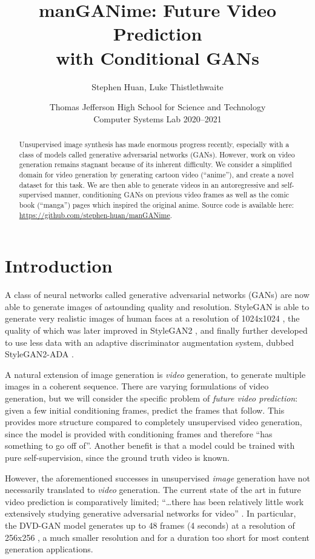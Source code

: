 \documentclass[11pt, oneside]{article}
\title{manGANime: Future Video Prediction \\ with Conditional GANs}
\author{Stephen Huan, Luke Thistlethwaite}
\date{Thomas Jefferson High School for Science and Technology \\
      Computer Systems Lab 2020--2021}
\begin{document}
\maketitle

\begin{abstract}
  Unsupervised image synthesis has made enormous progress recently, especially
  with a class of models called generative adversarial networks (GANs).
  However, work on video generation remains stagnant because of its inherent
  difficulty. We consider a simplified domain for video generation by
  generating cartoon video (\enquote{anime}), and create a novel dataset for
  this task. We are then able to generate videos in an autoregressive and
  self-supervised manner, conditioning GANs on previous video frames as well
  as the comic book (\enquote{manga}) pages which inspired the original anime.
  Source code is available here:
  \href{https://github.com/stephen-huan/manGANime}
       {https://github.com/stephen-huan/manGANime}.
\end{abstract}

\section{Introduction} \label{sec:intro} 
A class of neural networks called generative adversarial networks (GANs)
are now able to generate images of astounding quality and resolution.
StyleGAN is able to generate very realistic images of human faces at a
resolution of 1024x1024 \cite{stylegan}, the quality of which was later
improved in StyleGAN2 \cite{stylegan2}, and finally further developed to
use less data with an adaptive discriminator augmentation system, dubbed
StyleGAN2-ADA \cite{stylegan2ada}.

A natural extension of image generation is \emph{video} generation, to generate
multiple images in a coherent sequence. There are varying formulations of video
generation, but we will consider the specific problem of \emph{future video
prediction}: given a few initial conditioning frames, predict the frames that
follow. This provides more structure compared to completely unsupervised video
generation, since the model is provided with conditioning frames and therefore
\enquote{has something to go off of}. Another benefit is that a model could be
trained with pure self-supervision, since the ground truth video is known.

However, the aforementioned successes in unsupervised \emph{image}
generation have not necessarily translated to \emph{video} generation.
The current state of the art in future video prediction is comparatively
limited; \enquote{\ldots there has been relatively little work extensively
studying generative adversarial networks for video} \cite{scene}. In
particular, the DVD-GAN model generates up to 48 frames (4 seconds) at a
resolution of 256x256 \cite{dvdgan}, a much smaller resolution and for
a duration too short for most content generation applications.
\end{document}
